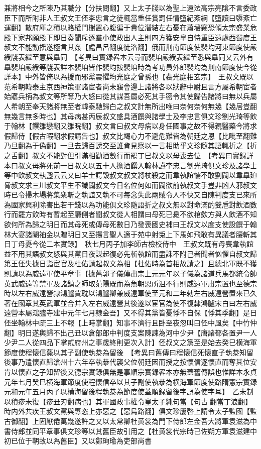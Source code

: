 兼將相今之所陳乃其職分【分扶問翻】又上太子牋以為聖上遠法高宗亮隂不言委政臣下而所附非人王叔文王伾李忠言之徒輒當重任賞罰任情墮紀紊綱【墮讀曰隳紊亡運翻】散府庫之積以賂權門樹置心腹徧于貴位潛結左右憂在蕭墻竊恐傾太宗盛業危殿下家邦願殿下即日奏聞斥逐羣小使政出人主則四方獲安臯自恃重臣遠處西蜀度王叔文不能動揺遂極言其姦【處昌呂翻度徒洛翻】俄而荆南節度使裴均河東節度使嚴綬牋表繼至意與臯同　【考異曰實録畧本云尋而裴垍嚴綬表繼至悉與臯同又云外有臯裴垍嚴綬等牋表詳本裴垍皆作裴均按裴垍時為考功員外郎裴均為荆南節度使今從詳本】中外皆倚以為援而邪黨震懼均光庭之曾孫也【裴光庭相玄宗】　王叔文既以范希朝韓泰主京西神策軍諸宦者尚未寤會邊上諸將各以狀辭中尉且言方屬希朝宦者始寤兵柄為叔文等所奪乃大怒曰從其謀吾屬必死其手密令其使歸告諸將曰無以兵屬人希朝至奉天諸將無至者韓泰馳歸白之叔文計無所出唯曰奈何奈何無幾【幾居豈翻無幾言無多時也】其母病甚丙辰叔文盛具酒饌與諸學士及李忠言俱文珍劉光琦等飲于翰林【饌雛戀翻又雛晥翻】叔文言曰叔文母病以身任國事之故不得親醫藥今將求假歸侍【假古暇翻求假請告也】叔文比竭心力不避危難皆為朝廷之恩【比毗至翻難乃旦翻為于偽翻】一旦去歸百謗交至誰肯見察以一言相助乎文珍隨其語輒折之【折之舌翻】叔文不能對但引滿相勸酒數行而罷丁巳叔文以母喪去位　【考異曰實録詳本曰叔文母將死前一日叔文以五十人擔酒饌入翰林讌李忠言劉光琦俱文珍及諸學士等中飲叔文執盞云云又曰羊士諤毁叔文叔文將杖殺之而韋執誼懦不敢劉闢以韋臯廹脅叔文求三川叔文平生不識闢叔文今日名位何如而闢欲前執叔文手豈非凶人邪叔文時已令掃木場將集衆斬之執誼又執不可每念失此兩賊令人不快又自陳判度支已來所為國家興利除害出若干錢以為功能俱文珍隨語折之叔文無以對命滿酌雙巵對飲酒數行而罷方飲時有暫起至廳側者聞叔文從人相謂曰母死已臰不欲棺歛方與人飲酒不知欲何所為歸之明日而其母死或傳母死數日乃發喪國史補曰王叔文以度支使設饌于翰林大宴諸閹䄂金以贈明日又至揚言聖人適于苑中射兎上下馬如飛敢有異議者腰斬其日丁母憂今從二本實録】　秋七月丙子加李師古檢校侍中　王叔文既有母喪韋執誼益不用其語叔文怒與其黨日夜謀起復必先斬執誼而盡誅不附己者聞者忷懼自叔文歸第王伾失據日詣宦官及杜佑請起叔文為相【杜佑時為首相故請之】且總北軍既不獲則請以為威遠軍使平章事【據舊郭子儀傳肅宗上元元年以子儀為諸道兵馬都統令帥英武威遠等禁軍及諸鎮之師取范陽既而為魚朝恩所沮不行則威遠軍肅宗置也至德宗時以左右威遠營隸鴻臚賈耽以鴻臚卿兼威遠軍使至元和二年勅左右威遠營置來已久著在國章其英武軍並合并入左右威遠營其後遂以宦官為使不復隸鴻臚宋白曰左右威遠營本屬鴻臚寺建中元年七月隸金吾】又不得其黨皆憂悸不自保【悸其季翻】是日伾坐翰林中疏三上不報【上時掌翻】知事不濟行且卧至夜忽叫曰伾中風矣【中竹仲翻】明日遂輿歸不出己丑以倉部郎中判度支案陳諫為河中少尹【唐諸都各置尹一人少尹二人從四品下掌貳府州之事歲終則更次入計】伾叔文之黨至是始去癸巳横海軍節度使程懷信薨以其子副使執㳟為留後　【考異曰舊傳曰程懷信死懷直子執㳟知留後事乃遣懷直歸滄州十六年卒執㳟代襲父位朝廷因而授之按懷信逐懷直而奪其位安肯以懷直之子知留後又德宗實録俱無是事順宗實録畧本亦無蓋舊傳誤也惟詳本永貞元年七月癸巳横海軍節度使程懷信卒以其子副使執㳟為横海軍節度使路隋憲宗實録元和元年五月丙子以横海留後程執㳟為節度使蓋順録留後字誤為使字耳】　乙未制以積疹未復【疹丑刃翻病也】其軍國政事權令皇太子純句當【句古翻當丁浪翻】時内外共疾王叔文黨與專恣上亦惡之【惡烏路翻】俱文珍屢啓上請令太子監國【監古御翻】上固厭倦萬幾遂許之又以太常卿杜黄裳為門下侍郎左金吾大將軍袁滋為中書侍郎並同平章事俱文珍等以其舊臣故引用之【杜黄裳代宗時已佐朔方軍袁滋建中初已位于朝故以為舊臣】又以鄭珣瑜為吏部尚書